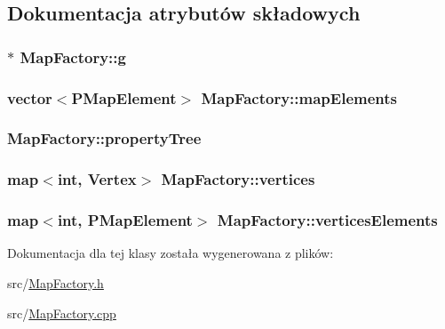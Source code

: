 \subsection{Dokumentacja atrybutów składowych}
\hypertarget{class_map_factory_af4450d69783b74d07d8686da50c66621}{
\subsubsection[{g}]{$\ast$ Map\-Factory\-::g\hspace{0.3cm}{\ttfamily [private]}}}\label{class_map_factory_af4450d69783b74d07d8686da50c66621}
\hypertarget{class_map_factory_ad4677e42d2e82c5ca31fa931fa60f9ce}{
\subsubsection[{map\-Elements}]{\setlength{\rightskip}{0pt plus 5cm}vector$<${\bf P\-Map\-Element}$>$ Map\-Factory\-::map\-Elements\hspace{0.3cm}{\ttfamily [private]}}}\label{class_map_factory_ad4677e42d2e82c5ca31fa931fa60f9ce}
\hypertarget{class_map_factory_af0cbd48b8917121329660bd28877fcc6}{
\subsubsection[{property\-Tree}]{ Map\-Factory\-::property\-Tree\hspace{0.3cm}{\ttfamily [private]}}}\label{class_map_factory_af0cbd48b8917121329660bd28877fcc6}
\hypertarget{class_map_factory_ab3f7a784d24d1cf06f03429312d030b4}{
\subsubsection[{vertices}]{\setlength{\rightskip}{0pt plus 5cm}map$<$int, {\bf Vertex}$>$ Map\-Factory\-::vertices\hspace{0.3cm}{\ttfamily [private]}}}\label{class_map_factory_ab3f7a784d24d1cf06f03429312d030b4}
\hypertarget{class_map_factory_aaf7d7680404bc0ac40766ca305f75753}{
\subsubsection[{vertices\-Elements}]{\setlength{\rightskip}{0pt plus 5cm}map$<$int, {\bf P\-Map\-Element}$>$ Map\-Factory\-::vertices\-Elements\hspace{0.3cm}{\ttfamily [private]}}}\label{class_map_factory_aaf7d7680404bc0ac40766ca305f75753}


Dokumentacja dla tej klasy została wygenerowana z plików\-:\begin{DoxyCompactItemize}
\item 
src/\hyperlink{_map_factory_8h}{Map\-Factory.\-h}\item 
src/\hyperlink{_map_factory_8cpp}{Map\-Factory.\-cpp}\end{DoxyCompactItemize}

